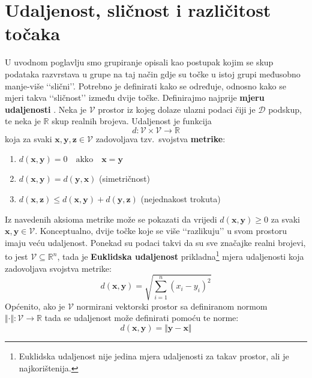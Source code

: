\documentclass[times, utf8, zavrsni]{fer}
\begin{document}
\section{Udaljenost, sličnost i različitost točaka}
\label{pointsimilarity}
U uvodnom poglavlju smo grupiranje opisali kao postupak kojim se skup podataka razvrstava u grupe na taj način gdje su točke u istoj grupi međusobno manje-više ‘‘slični’’. Potrebno je definirati kako se određuje, odnosno kako se mjeri takva ‘‘sličnost’’ između dvije točke. Definirajmo najprije \textbf{mjeru udaljenosti} . Neka je $\mathcal{V}$ prostor iz kojeg dolaze ulazni podaci čiji je $\mathcal{D}$ podskup, te neka je $\mathbb{R}$ skup realnih brojeva. Udaljenost je funkcija
\[d: \mathcal{V} \times \mathcal{V} \to \mathbb{R}\]
koja za svaki \(\mathbf{x}, \mathbf{y}, \mathbf{z} \in \mathcal{V}\) zadovoljava tzv.\ svojstva \textbf{metrike}:
\begin{enumerate}
    \item \(d \left(\mathbf{x}, \mathbf{y}\right) = 0 \quad
                \text{akko} \quad \mathbf{x} = \mathbf{y}\)
    \item \(d \left(\mathbf{x}, \mathbf{y}\right) = d \left(\mathbf{y}, \mathbf{x}\right)\) \qquad (simetričnost)
    \item \(d \left(\mathbf{x}, \mathbf{z}\right) \leq 
            d \left(\mathbf{x}, \mathbf{y}\right)
            + d \left(\mathbf{y}, \mathbf{z}\right)\) \qquad (nejednakost trokuta)
\end{enumerate}
Iz navedenih aksioma metrike može se pokazati da vrijedi \(d \left(\mathbf{x}, \mathbf{y}\right) \geq 0\)
za svaki \(\mathbf{x}, \mathbf{y} \in \mathcal{V}\).
Konceptualno, dvije točke koje se više ‘‘razlikuju’’ u svom prostoru imaju veću udaljenost.
Ponekad su podaci takvi da su sve značajke realni brojevi, to jest \(\mathcal{V} \subseteq \mathbb{R}^n\), tada je \textbf{Euklidska udaljenost} prikladna\footnote{Euklidska udaljenost nije jedina mjera udaljenosti za takav prostor, ali je najkorištenija.} mjera udaljenosti koja zadovoljava svojstva metrike:
\begin{equation}
    d \left(\mathbf{x}, \mathbf{y}\right) = 
    \sqrt{\sum_{i=1}^{n} \left(x_i - y_i\right)^2}
    \label{euclidean_distance}
\end{equation}
Općenito, ako je \(\mathcal{V}\) normirani vektorski prostor sa definiranom normom \(\Vert \cdot \Vert : \mathcal{V} \to \mathbb{R}\) tada se udaljenost može definirati pomoću te norme:
\begin{equation}
    d \left(\mathbf{x}, \mathbf{y}\right) = \Vert \mathbf{y} - \mathbf{x} \Vert
    \label{norm_distance}
\end{equation}
\end{document}
